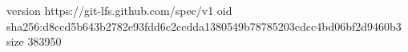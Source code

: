 version https://git-lfs.github.com/spec/v1
oid sha256:d8ccd5b643b2782e93fdd6c2ccdda1380549b78785203cdcc4bd06bf2d9460b3
size 383950
